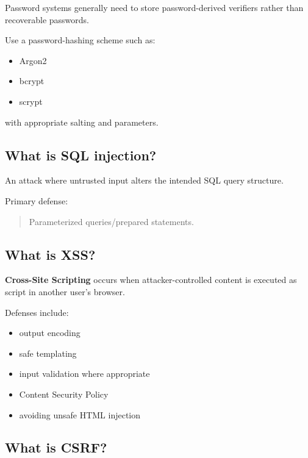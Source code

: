 Password systems generally need to store password-derived verifiers rather than recoverable passwords.

Use a password-hashing scheme such as:

\begin{itemize}
  \item Argon2
  \item bcrypt
  \item scrypt
\end{itemize}

with appropriate salting and parameters.

\medskip

\subsection{What is SQL injection?}

An attack where untrusted input alters the intended SQL query structure.

Primary defense:

\begin{quote}
Parameterized queries/prepared statements.\\
\end{quote}

\medskip

\subsection{What is XSS?}

\textbf{Cross-Site Scripting} occurs when attacker-controlled content is executed as script in another user's browser.

Defenses include:

\begin{itemize}
  \item output encoding
  \item safe templating
  \item input validation where appropriate
  \item Content Security Policy
  \item avoiding unsafe HTML injection
\end{itemize}

\medskip

\subsection{What is CSRF?}

